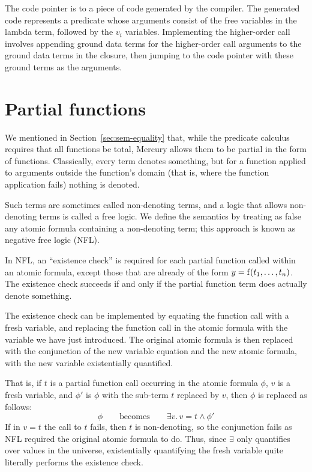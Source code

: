 The code pointer is to a piece of code generated by the compiler.
The generated code represents a predicate
whose arguments consist of the free variables in the lambda term,
followed by the $v_i$ variables.
Implementing the higher-order call involves
appending ground data terms for the higher-order call arguments
to the ground data terms in the closure,
then jumping to the code pointer
with these ground terms as the arguments.


\section{Partial functions}
\label{sec:partial}

We mentioned in Section~\ref{sec:sem-equality} that,
while the predicate calculus requires that all functions be total,
Mercury allows them to be partial in the form of  functions.
Classically, every term denotes something,
but for a  function applied to arguments
outside the function's domain
(that is, where the function application fails)
nothing is denoted.

Such terms are sometimes called non-denoting terms\label{gi:non-denoting},
and a logic that allows non-denoting terms is called a free logic.
We define the semantics by treating as false
any atomic formula containing a non-denoting term;
this approach is known as negative free logic (NFL)\label{gi:nfl}.

In NFL,
an ``existence check'' is required
for each partial function called within an atomic formula,
except those that are already of the form $y = \operatorname{f}(t_1, \ldots, t_n)$.
The existence check succeeds if and only if
the partial function term does actually denote something.

The existence check can be implemented by
equating the function call with a fresh variable,
and replacing the function call in the atomic formula
with the variable we have just introduced.
The original atomic formula is then replaced with
the conjunction of the new variable equation
and the new atomic formula,
with the new variable existentially quantified.

That is,
if $t$ is a partial function call occurring in the atomic formula $\phi$,
$v$ is a fresh variable,
and $\phi'$ is $\phi$ with the sub-term $t$ replaced by $v$,
then $\phi$ is replaced as follows:
\[
\phi \qquad \mathrm{becomes} \qquad \exists v.\, v = t \land \phi'
\]
If in $v = t$ the call to $t$ fails,
then $t$ is non-denoting,
so the conjunction fails
as NFL required the original atomic formula to do.
Thus,
since $\exists$ only quantifies over values in the universe,
existentially quantifying the fresh variable
quite literally performs the existence check.

